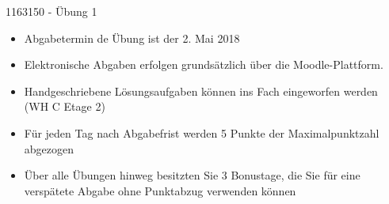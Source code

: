 \documentclass[addpoints,a4paper,ngerman,12pt,answers]{exam}
\begin{document}
\vspace*{2em}

\begin{center}
	{\Large 1163150 - Übung 1}
\end{center}

\vspace*{3em}


\vspace*{2em}


\vspace*{2em}

\begin{itemize}
\item Abgabetermin de Übung ist der 2. Mai 2018
\item Elektronische Abgaben erfolgen grundsätzlich über die Moodle-Plattform.
\item Handgeschriebene Lösungsaufgaben können ins Fach eingeworfen werden (WH C Etage 2)
\item Für jeden Tag nach Abgabefrist werden 5 Punkte der Maximalpunktzahl abgezogen
\item Über alle Übungen hinweg besitzten Sie 3 Bonustage, die Sie für eine verspätete Abgabe ohne Punktabzug verwenden können
\end{itemize}

\vspace*{25em}

\begin{center}
	\gradetable[h][questions]
\end{center}

\clearpage
\end{document}
